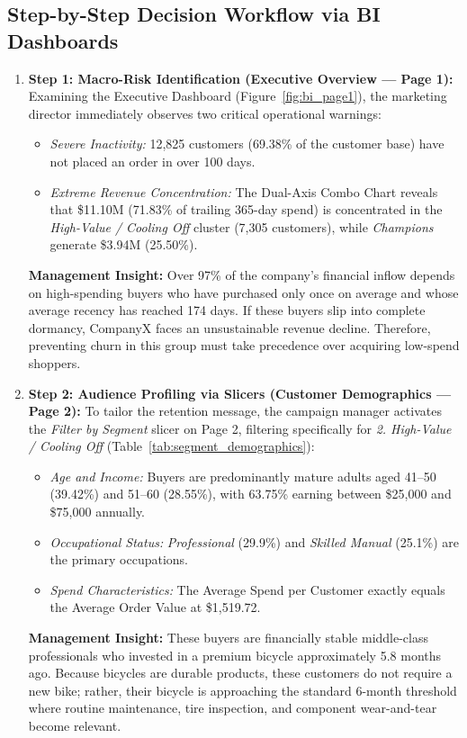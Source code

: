 \subsection{Step-by-Step Decision Workflow via BI Dashboards}
\begin{enumerate}
    \item \textbf{Step 1: Macro-Risk Identification (Executive Overview --- Page 1):}
    Examining the Executive Dashboard (Figure~\ref{fig:bi_page1}), the marketing director immediately observes two critical operational warnings:
    \begin{itemize}
        \item \emph{Severe Inactivity:} 12,825 customers (69.38\% of the customer base) have not placed an order in over 100 days.
        \item \emph{Extreme Revenue Concentration:} The Dual-Axis Combo Chart reveals that \$11.10M (71.83\% of trailing 365-day spend) is concentrated in the \textit{High-Value / Cooling Off} cluster (7,305 customers), while \textit{Champions} generate \$3.94M (25.50\%).
    \end{itemize}
    \textbf{Management Insight:} Over 97\% of the company's financial inflow depends on high-spending buyers who have purchased only once on average and whose average recency has reached 174 days. If these buyers slip into complete dormancy, CompanyX faces an unsustainable revenue decline. Therefore, preventing churn in this group must take precedence over acquiring low-spend shoppers.

    \item \textbf{Step 2: Audience Profiling via Slicers (Customer Demographics --- Page 2):}
    To tailor the retention message, the campaign manager activates the \textit{Filter by Segment} slicer on Page 2, filtering specifically for \textit{2. High-Value / Cooling Off} (Table~\ref{tab:segment_demographics}):
    \begin{itemize}
        \item \emph{Age and Income:} Buyers are predominantly mature adults aged 41--50 (39.42\%) and 51--60 (28.55\%), with 63.75\% earning between \$25,000 and \$75,000 annually.
        \item \emph{Occupational Status:} \textit{Professional} (29.9\%) and \textit{Skilled Manual} (25.1\%) are the primary occupations.
        \item \emph{Spend Characteristics:} The Average Spend per Customer exactly equals the Average Order Value at \$1,519.72. 
    \end{itemize}
    \textbf{Management Insight:} These buyers are financially stable middle-class professionals who invested in a premium bicycle approximately 5.8 months ago. Because bicycles are durable products, these customers do not require a new bike; rather, their bicycle is approaching the standard 6-month threshold where routine maintenance, tire inspection, and component wear-and-tear become relevant.


\end{enumerate}
